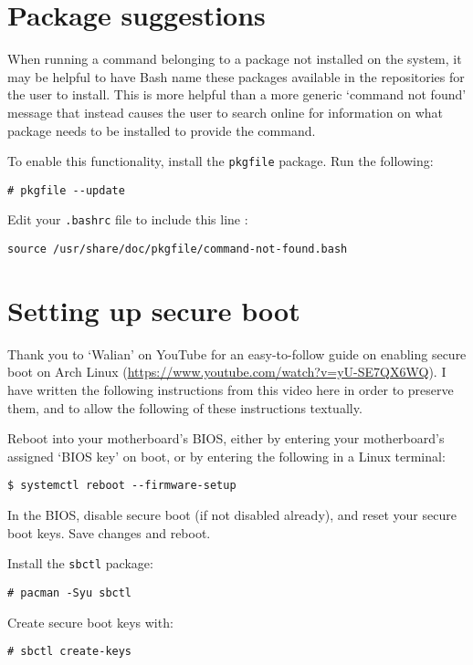 \documentclass[a4paper]{article}
\begin{document}
\section{Package suggestions}

When running a command belonging to a package not installed on the system, it may be helpful to have Bash name these packages available in the repositories for the user to install.
This is more helpful than a more generic `command not found' message that instead causes the user to search online for information on what package needs to be installed to provide the command.

To enable this functionality, install the \lstinline|pkgfile| package.
Run the following:
\begin{lstlisting}
# pkgfile --update
\end{lstlisting}
Edit your \lstinline|.bashrc| file to include this line \cite{arch-command-not-found}:
\begin{lstlisting}
source /usr/share/doc/pkgfile/command-not-found.bash
\end{lstlisting}

\section{Setting up secure boot}

Thank you to `Walian' on YouTube for an easy-to-follow guide on enabling secure boot on Arch Linux (\url{https://www.youtube.com/watch?v=yU-SE7QX6WQ}).
I have written the following instructions from this video here in order to preserve them, and to allow the following of these instructions textually.

Reboot into your motherboard's BIOS, either by entering your motherboard's assigned `BIOS key' on boot, or by entering the following in a Linux terminal:
\begin{lstlisting}
$ systemctl reboot --firmware-setup
\end{lstlisting}

In the BIOS, disable secure boot (if not disabled already), and reset your secure boot keys.
Save changes and reboot.

Install the \lstinline|sbctl| package:
\begin{lstlisting}
# pacman -Syu sbctl
\end{lstlisting}

Create secure boot keys with:
\begin{lstlisting}
# sbctl create-keys
\end{lstlisting}
\end{document}
